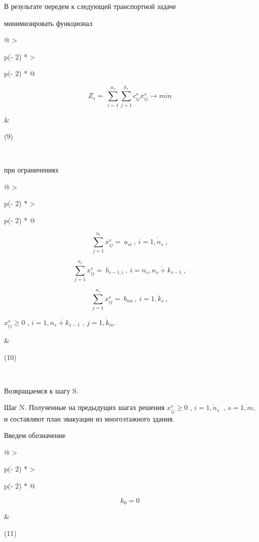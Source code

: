 \documentclass[
]{article}
\begin{document}
В результате передем к следующей транспортной задаче

минимизировать функционал

\begin{longtable}[]{@{}
  >{\raggedright\arraybackslash}p{(\columnwidth - 2\tabcolsep) * }
  >{\raggedright\arraybackslash}p{(\columnwidth - 2\tabcolsep) * }@{}}
\toprule\noalign{}
\begin{minipage}[b]{\linewidth}\raggedright
\[Z_{s} = \ \sum_{i = 1}^{n_{s}}{\sum_{j = 1}^{k_{s}}{c_{ij}^{s}x_{ij}^{s} \rightarrow min}}\]
\end{minipage} & \begin{minipage}[b]{\linewidth}\raggedright
(9)
\end{minipage} \\
\midrule\noalign{}
\endhead
\bottomrule\noalign{}
\endlastfoot
\end{longtable}

при ограничениях

\begin{longtable}[]{@{}
  >{\raggedright\arraybackslash}p{(\columnwidth - 2\tabcolsep) * }
  >{\raggedright\arraybackslash}p{(\columnwidth - 2\tabcolsep) * }@{}}
\toprule\noalign{}
\begin{minipage}[b]{\linewidth}\raggedright
\[\sum_{j = 1}^{n_{i}}x_{ij}^{s} = \ a_{si}\ ,\ i = \overline{1,n_{s}}\ ,\]

\[\sum_{j = 1}^{n_{i}}x_{ij}^{s} = \ b_{s - 1,i}\ ,\ i = \overline{n_{s},n_{s} + k_{s - 1}}\ ,\]

\[\sum_{j = 1}^{n_{i}}x_{ij}^{s} = \ b_{mi}\ ,\ i = \overline{1,k_{s}}\ ,\]

\(x_{ij}^{s} \geq 0\) , \(i = \overline{1,n_{s} + k_{s - 1}}\) ,
\(j = \overline{1,k_{m}}\).
\end{minipage} & \begin{minipage}[b]{\linewidth}\raggedright
(10)
\end{minipage} \\
\midrule\noalign{}
\endhead
\bottomrule\noalign{}
\endlastfoot
\end{longtable}

Возвращаемся к шагу S.

Шаг N. Полученные на предыдущих шагах решения \(x_{ij}^{s} \geq 0\) ,
\(i = \overline{1,n_{s}}\ \) , \(s = \overline{1,m}\), и составляют план
эвакуации из многоэтажного здания.

Введем обозначение

\begin{longtable}[]{@{}
  >{\raggedright\arraybackslash}p{(\columnwidth - 2\tabcolsep) * }
  >{\raggedright\arraybackslash}p{(\columnwidth - 2\tabcolsep) * }@{}}
\toprule\noalign{}
\begin{minipage}[b]{\linewidth}\raggedright
\[k_{0} = 0\]
\end{minipage} & \begin{minipage}[b]{\linewidth}\raggedright
(11)
\end{minipage} \\
\midrule\noalign{}
\endhead
\bottomrule\noalign{}
\endlastfoot
\end{longtable}
\end{document}
